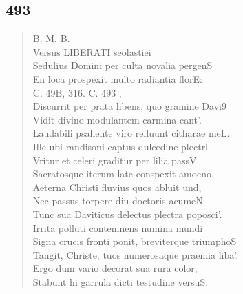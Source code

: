 \documentclass[11pt, a4paper]{report}
\begin{document}
            \subsection*{493}
      \begin{verse}
      B. M. B. \\ Versus LIBERATI seolastiei \\ Sedulius Domini per culta novalia pergenS \\ En loca prospexit multo radiantia florE: \\ 
        ﻿\pagebreak 
    C. 49B, 316. C. 493 , \\ Discurrit per prata libens, quo gramine Davi9 \\ Vidit divino modulantem carmina cant’. \\ Laudabili psallente viro refluunt citharae meL. \\ Ille ubi randisoni captus dulcedine plectrl \\ Vritur et celeri graditur per lilia passV \\ Sacratosque iterum late conspexit amoeno, \\ Aeterna Christi fluvius quos abluit und, \\ Nec passus torpere diu doctoris acumeN \\ Tunc sua Daviticus delectus plectra poposci’. \\ Irrita polluti contemnens numina mundi \\ Signa crucis fronti ponit, breviterque triumphoS \\ Tangit, Christe, tuos numerosaque praemia liba’. \\ Ergo dum vario decorat sua rura color, \\ Stabunt hi garrula dicti testudine versuS. \\ 
      \end{verse}
  
\end{document}
